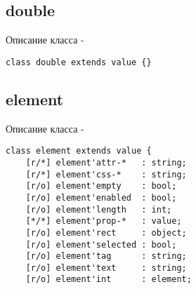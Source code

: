\subsection{{\color{lightblue} double}}

\noindent Описание класса \double -
\begin{lstlisting}[numbers=none]
class double extends value {}
\end{lstlisting}

\subsection{{\color{lightblue} element}}

\noindent Описание класса \element -
\begin{lstlisting}[numbers=none]
class element extends value {
    [r/*] element'attr-*   : string;
    [r/*] element'css-*    : string;
    [r/o] element'empty    : bool;
    [r/o] element'enabled  : bool;
    [r/o] element'length   : int;
    [*/*] element'prop-*   : value;
    [r/o] element'rect     : object;
    [r/o] element'selected : bool;
    [r/o] element'tag      : string;
    [r/o] element'text     : string;
    [r/o] element'int      : element;


\end{lstlisting}

